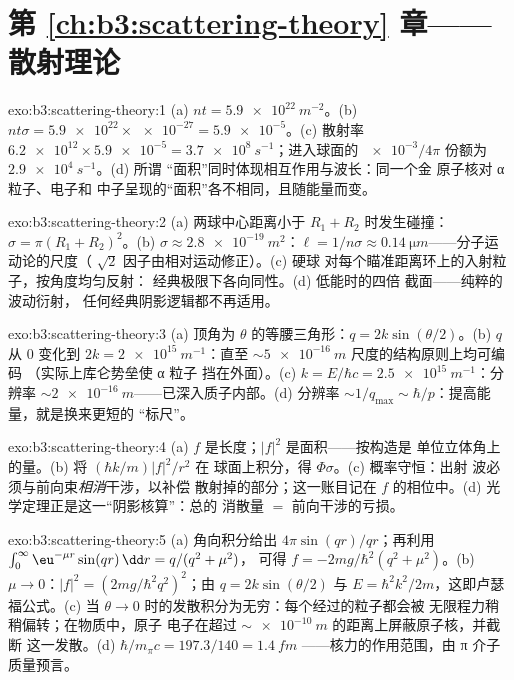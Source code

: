 \section*{第 \ref{ch:b3:scattering-theory} 章——散射理论}

\begin{solution}{exo:b3:scattering-theory:1}
(a) $nt = \qty{5.9e22}{m^{-2}}$。(b) $nt\sigma = \num{5.9e22}
\times \num{e-27} = \num{5.9e-5}$。(c) 散射率
$\num{6.2e12} \times \num{5.9e-5} = \qty{3.7e8}{s^{-1}}$；进入球面的
$\num{e-3}/4\pi$ 份额为 $\qty{2.9e4}{s^{-1}}$。(d) 所谓
“面积”同时体现相互作用与波长：同一个金
原子核对 α 粒子、电子和
中子呈现的“面积”各不相同，且随能量而变。
\end{solution}

\begin{solution}{exo:b3:scattering-theory:2}
(a) 两球中心距离小于 $R_1 + R_2$ 时发生碰撞：$\sigma = \pi(R_1 +
R_2)^2$。(b) $\sigma \approx \qty{2.8e-19}{m^2}$：$\ell = 1/n\sigma
\approx \qty{0.14}{\micro m}$——分子运动论的尺度（
$\sqrt2$ 因子由相对运动修正）。(c) 硬球
对每个瞄准距离环上的入射粒子，按角度均匀反射：
经典极限下各向同性。(d) 低能时的四倍
截面——纯粹的波动衍射，
任何经典阴影逻辑都不再适用。
\end{solution}

\begin{solution}{exo:b3:scattering-theory:3}
(a) 顶角为 $\theta$ 的等腰三角形：$q =
2k\sin(\theta/2)$。(b) $q$ 从 $0$ 变化到 $2k = \qty{2e15}{
m^{-1}}$：直至 $\sim\qty{5e-16}{m}$ 尺度的结构原则上均可编码
（实际上库仑势垒使 α 粒子
挡在外面）。(c) $k = E/\hbar c = \qty{2.5e15}{m^{-1}}$：分辨率
$\sim\qty{2e-16}{m}$——已深入质子内部。(d) 分辨率
$\sim 1/q_{\max} \sim \hbar/p$：提高能量，就是换来更短的
“标尺”。
\end{solution}

\begin{solution}{exo:b3:scattering-theory:4}
(a) $f$ 是长度；$|f|^2$ 是面积——按构造是
单位立体角上的量。(b) 将 $(\hbar k/m)|f|^2/r^2$ 在
球面上积分，得 $\Phi\sigma$。(c) 概率守恒：出射
波必须与前向束\emph{相消}干涉，以补偿
散射掉的部分；这一账目记在 $f$ 的相位中。(d)
光学定理正是这一“阴影核算”：总的
消散量 $=$ 前向干涉的亏损。
\end{solution}

\begin{solution}{exo:b3:scattering-theory:5}
(a) 角向积分给出 $4\pi\sin(qr)/qr$；再利用
$\int_0^\infty\eu^{-\mu r}\sin(qr)\,\dd r = q/(q^2 + \mu^2)$，
可得 $f = -2mg/\hbar^2(q^2 + \mu^2)$。(b) $\mu \to 0$：$|f|^2 =
(2mg/\hbar^2q^2)^2$；由 $q = 2k\sin(\theta/2)$ 与 $E =
\hbar^2k^2/2m$，这即卢瑟福公式。(c) 当 $\theta \to
0$ 时的发散积分为无穷：每个经过的粒子都会被
无限程力稍稍偏转；在物质中，原子
电子在超过 $\sim\qty{e-10}{m}$ 的距离上屏蔽原子核，并截断
这一发散。(d) $\hbar/m_\pi c = 197.3/140 = \qty{1.4}{fm}$
——核力的作用范围，由 π 介子质量预言。
\end{solution}

